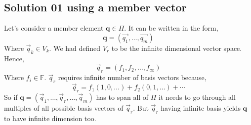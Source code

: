 \documentclass[letter]{article}
\begin{document}
\subsection*{Solution 01 using a member vector} 
Let's consider a member element $\mathbf{q} \in \Pi$. It can be written in the form, 
\[
\mathbf{q} = (\vec{q_1}, \ldots, \vec{q_m})
\]
Where $\vec{q}_k \in V_k$. We had defined $V_r$ to be the infinite dimensional vector space. Hence, 
\[
\vec{q}_r = (f_1, f_2 ,\ldots, f_\infty)
\]
Where $f_i \in \mathbb{F}$.  $\vec{q}_r$ requires infinite number of basis vectors because, 
\[
\vec{q}_r = f_1 (1, 0, \ldots) + f_2 (0,1 , \ldots) + \cdots 
\]
So if $\mathbf q = (\vec{q}_1, \ldots, \vec{q}_r, \ldots, \vec{q}_m)$ has to span all of $\Pi$ it needs to go through all multiples of all possible basis vectors of $\vec{q}_r$. But $\vec{q}_r$ having infinite basis yields $\mathbf q$ to have infinite dimension too.
\end{document}
